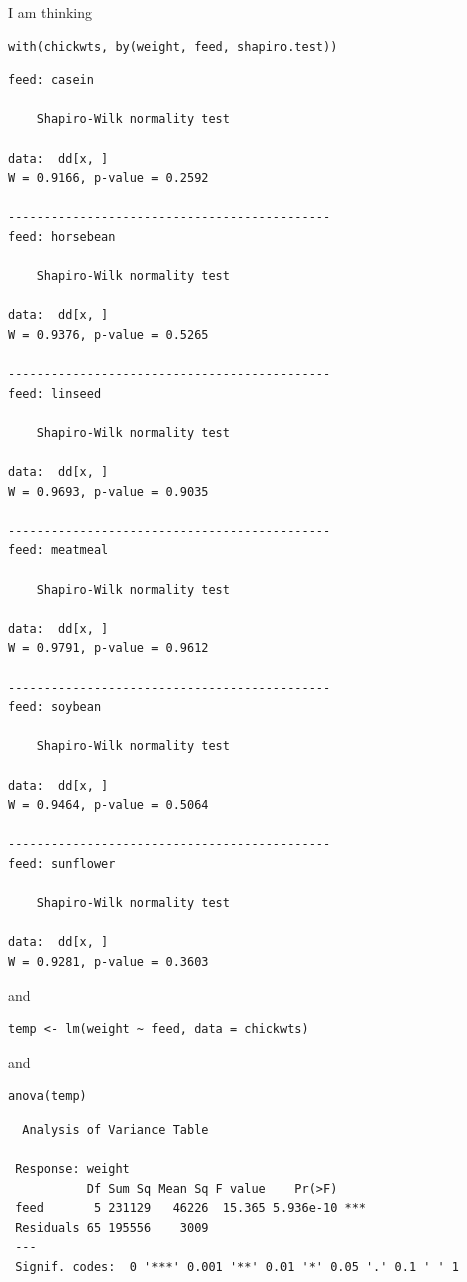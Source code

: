 \documentclass[captions=tableheading]{scrbook}
\begin{document}
I am thinking 

\begin{verbatim}
with(chickwts, by(weight, feed, shapiro.test))
\end{verbatim}


\begin{verbatim}
feed: casein

	Shapiro-Wilk normality test

data:  dd[x, ] 
W = 0.9166, p-value = 0.2592

--------------------------------------------- 
feed: horsebean

	Shapiro-Wilk normality test

data:  dd[x, ] 
W = 0.9376, p-value = 0.5265

--------------------------------------------- 
feed: linseed

	Shapiro-Wilk normality test

data:  dd[x, ] 
W = 0.9693, p-value = 0.9035

--------------------------------------------- 
feed: meatmeal

	Shapiro-Wilk normality test

data:  dd[x, ] 
W = 0.9791, p-value = 0.9612

--------------------------------------------- 
feed: soybean

	Shapiro-Wilk normality test

data:  dd[x, ] 
W = 0.9464, p-value = 0.5064

--------------------------------------------- 
feed: sunflower

	Shapiro-Wilk normality test

data:  dd[x, ] 
W = 0.9281, p-value = 0.3603
\end{verbatim}

and

\begin{verbatim}
temp <- lm(weight ~ feed, data = chickwts)
\end{verbatim}
and 

\begin{verbatim}
anova(temp)
\end{verbatim}

\begin{verbatim}
  Analysis of Variance Table
 
 Response: weight
           Df Sum Sq Mean Sq F value    Pr(>F)    
 feed       5 231129   46226  15.365 5.936e-10 ***
 Residuals 65 195556    3009                      
 ---
 Signif. codes:  0 '***' 0.001 '**' 0.01 '*' 0.05 '.' 0.1 ' ' 1
\end{verbatim}
\end{document}
